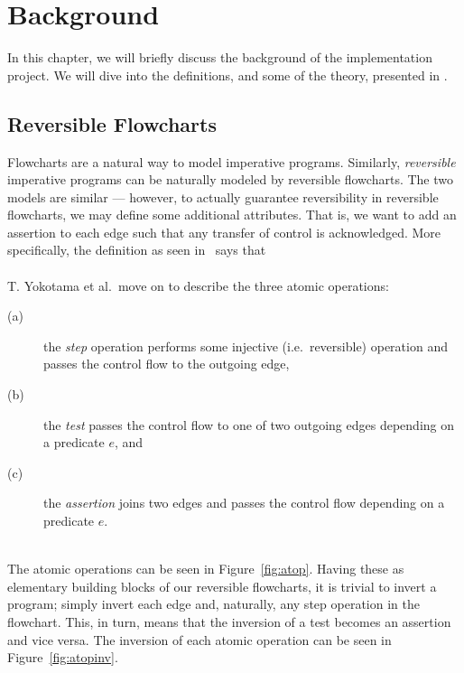 \chapter*{Background}
%

In this chapter, we will briefly discuss the background of the implementation project. We will dive into the definitions, and some of the theory, presented in \cite{REV}. %

\section*{Reversible Flowcharts}
%
Flowcharts are a natural way to model imperative programs. Similarly, \textit{reversible} imperative programs can be naturally modeled by reversible flowcharts. The two models are similar --- however, to actually guarantee reversibility in reversible flowcharts, we may define some additional attributes. That is, we want to add an assertion to each edge such that any transfer of control is acknowledged. More specifically, the definition as seen in~\cite{REV} says that \\

 \\

\noindent T. Yokotama et al.\ move on to describe the three atomic operations:\\
\begin{description}
  \item[(a)] the \textit{step} operation performs some injective (i.e.\ reversible) operation and passes the control flow to the outgoing edge,
  \item[(b)] the \textit{test} passes the control flow to one of two outgoing edges depending on a predicate $e$, and
  \item[(c)] the \textit{assertion} joins two edges and passes the control flow depending on a predicate $e$.
\end{description}~\\
\noindent The atomic operations can be seen in Figure~\ref{fig:atop}. Having these as elementary building blocks of our reversible flowcharts, it is trivial to invert a program; simply invert each edge and, naturally, any step operation in the flowchart. This, in turn, means that the inversion of a test becomes an assertion and vice versa. The inversion of each atomic operation can be seen in Figure~\ref{fig:atopinv}.

